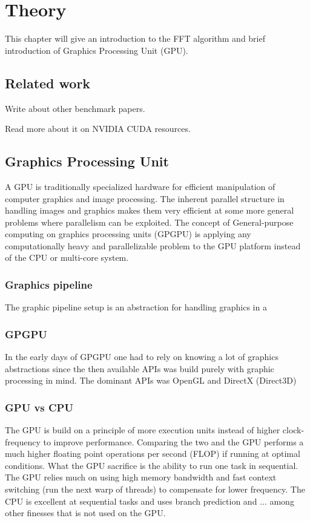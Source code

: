 \chapter{Theory}

This chapter will give an introduction to the FFT algorithm and brief introduction of Graphics Processing Unit (GPU).

\section{Related work}

Write about other benchmark papers.

Read more about it on NVIDIA CUDA resources.

\section{Graphics Processing Unit}

A GPU is traditionally specialized hardware for efficient manipulation of computer graphics and image processing. The inherent parallel structure in handling images and graphics makes them very efficient at some more general problems where parallelism can be exploited. The concept of General-purpose computing on graphics processing units (GPGPU) is applying any computationally heavy and parallelizable problem to the GPU platform instead of the CPU or multi-core system.

\subsection{Graphics pipeline}

The graphic pipeline setup is an abstraction for handling graphics in a 

\subsection{GPGPU}

In the early days of GPGPU one had to rely on knowing a lot of graphics abstractions since the then available APIs was build purely with graphic processing in mind. The dominant APIs was OpenGL and DirectX (Direct3D)

\subsection{GPU vs CPU}

The GPU is build on a principle of more execution units instead of higher clock-frequency to improve performance. Comparing the two and the GPU performs a much higher floating point operations per second (FLOP) if running at optimal conditions. What the GPU sacrifice is the ability to run one task in sequential. The GPU relies much on using high memory bandwidth and fast context switching (run the next warp of threads) to compensate for lower frequency. The CPU is excellent at sequential tasks and uses branch prediction and ... among other finesses that is not used on the GPU.

